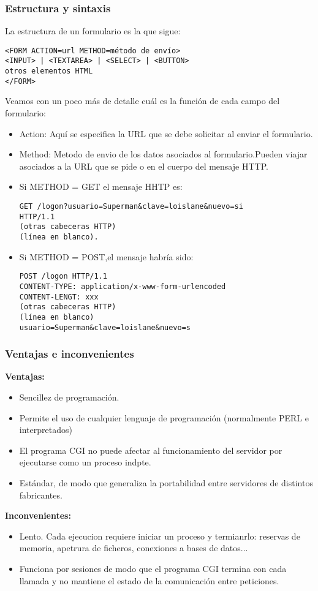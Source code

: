 \documentclass{apuntes}
\begin{document}
\subsubsection{Estructura y sintaxis}
La estructura de un formulario es la que sigue:
\begin{verbatim}
<FORM ACTION=url METHOD=método de envío>
<INPUT> | <TEXTAREA> | <SELECT> | <BUTTON>
otros elementos HTML
</FORM>
\end{verbatim}

Veamos con un poco más de detalle cuál es la función de cada campo del formulario:
\begin{itemize}
\item Action: Aquí se especifica la URL que se debe solicitar al enviar el formulario.
\item Method: Metodo de envio de los datos asociados al formulario.Pueden viajar asociados a la URL que se pide o en el cuerpo del mensaje HTTP.
\item Si METHOD = GET el mensaje HHTP es:
\begin{verbatim}
GET /logon?usuario=Superman&clave=loislane&nuevo=si
HTTP/1.1
(otras cabeceras HTTP)
(línea en blanco).
\end{verbatim}
\item Si METHOD = POST,el mensaje habría sido:
\begin{verbatim}
POST /logon HTTP/1.1
CONTENT-TYPE: application/x-www-form-urlencoded
CONTENT-LENGT: xxx
(otras cabeceras HTTP)
(línea en blanco)
usuario=Superman&clave=loislane&nuevo=s
\end{verbatim}
\end{itemize}

\subsubsection{Ventajas e inconvenientes}
\textbf{Ventajas:}
\begin{itemize}
\item Sencillez de programación.
\item Permite el uso de cualquier lenguaje de programación (normalmente PERL e interpretados)
\item El programa CGI no puede afectar al funcionamiento del servidor por ejecutarse como un proceso indpte.
\item Estándar, de modo que generaliza la portabilidad entre servidores de distintos fabricantes.
\end{itemize}
\textbf{Inconvenientes:}
\begin{itemize}
\item Lento. Cada ejecucion requiere iniciar un proceso y termianrlo: reservas de memoria, apetrura de ficheros, conexiones a bases de datos...
\item Funciona por sesiones de modo que el programa CGI termina con cada llamada y no mantiene el estado de la comunicación entre peticiones.
\end{itemize}
\end{document}
